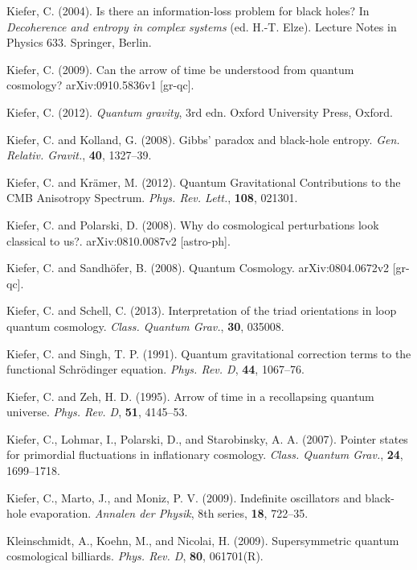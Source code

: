 \documentclass[12pt]{article}
\begin{document}
\bibitem{} Kiefer, C. (2004). Is there an information-loss problem
           for black holes? In {\em Decoherence and
           entropy in complex systems} (ed. H.-T. Elze). 
           Lecture Notes in Physics 633. Spring\-er, Berlin.

\bibitem{} Kiefer, C. (2009). Can the arrow of time be understood from
quantum cosmology? arXiv:0910.5836v1 [gr-qc].

\bibitem{} Kiefer, C. (2012). {\em Quantum gravity}, 3rd edn. Oxford
  University Press, Oxford.

\bibitem{} Kiefer, C. and Kolland, G. (2008). 
           Gibbs' paradox and black-hole entropy.
           {\em Gen. Relativ. Gravit.}, {\bf 40}, 1327--39.

\bibitem{} Kiefer, C. and Kr\"amer, M. (2012).
Quantum Gravitational Contributions to the CMB Anisotropy Spectrum.
 {\em Phys. Rev. Lett.}, {\bf 108}, 021301.

\bibitem{} Kiefer, C. and Polarski, D. (2008).
Why do cosmological perturbations look classical to us?.
 arXiv:0810.0087v2 [astro-ph].

\bibitem{} Kiefer, C. and Sandh\"ofer, B. (2008). Quantum Cosmology.
            arXiv:0804.0672v2 [gr-qc]. 

\bibitem{} Kiefer, C. and Schell, C. (2013). Interpretation of the
  triad orientations in loop quantum cosmology. {\em Class. Quantum
    Grav.}, {\bf 30}, 035008.

\bibitem{} Kiefer, C. and Singh, T. P. (1991). Quantum gravitational
           correction terms to the functional Schr\"odinger equation.
           {\em Phys. Rev. D}, {\bf 44}, 1067--76.

\bibitem{} Kiefer, C. and Zeh, H. D. (1995). Arrow of time in a recollapsing
           quantum universe. {\em Phys. Rev. D}, {\bf 51}, 4145--53.

\bibitem{} Kiefer, C., Lohmar, I., Polarski, D., and Starobinsky,
A. A. (2007). Pointer states for primordial fluctuations in
inflationary cosmology. {\em Class. Quantum Grav.}, {\bf 24}, 1699--1718.

\bibitem{} Kiefer, C., Marto, J., and Moniz, P. V. (2009).
           Indefinite oscillators and black-hole evaporation.
           {\em Annalen der Physik}, 8th series, {\bf 18}, 722--35.

\bibitem{} Kleinschmidt, A., Koehn, M., and Nicolai, H. (2009).
           Supersymmetric quantum cosmological billiards.
           {\em Phys. Rev. D}, {\bf 80}, 061701(R).
\end{document}
